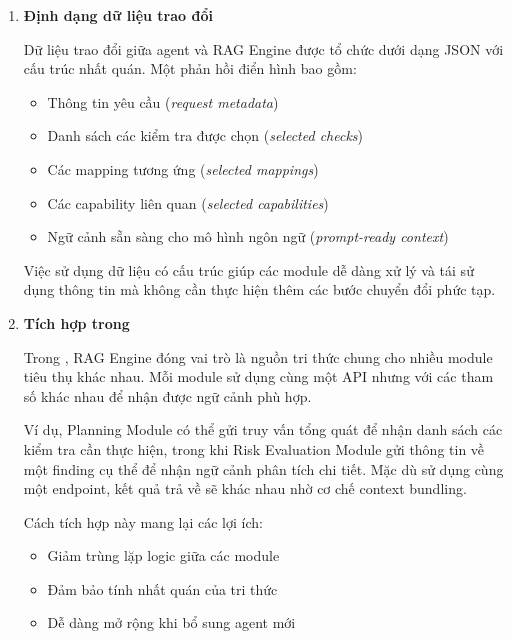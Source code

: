 \begin{enumerate}
    Luồng tương tác bao gồm:
    \begin{itemize}
        \item Agent xác định nhu cầu (planning, risk analysis hoặc reporting)
        \item Module gửi yêu cầu đến RAG Engine kèm theo các tham số cần thiết
        \item RAG Engine thực hiện pipeline truy hồi và xây dựng ngữ cảnh
        \item Kết quả được trả về dưới dạng bundle có cấu trúc
        \item Agent sử dụng bundle làm đầu vào cho quá trình suy luận
    \end{itemize}

    Cách tiếp cận này giúp chuẩn hóa giao tiếp giữa các thành phần và giảm sự phụ thuộc giữa agent và hệ thống lưu trữ tri thức.

    \item \textbf{Định dạng dữ liệu trao đổi}

    Dữ liệu trao đổi giữa agent và RAG Engine được tổ chức dưới dạng JSON với cấu trúc nhất quán. Một phản hồi điển hình bao gồm:
    \begin{itemize}
        \item Thông tin yêu cầu (\textit{request metadata})
        \item Danh sách các kiểm tra được chọn (\textit{selected checks})
        \item Các mapping tương ứng (\textit{selected mappings})
        \item Các capability liên quan (\textit{selected capabilities})
        \item Ngữ cảnh sẵn sàng cho mô hình ngôn ngữ (\textit{prompt-ready context})
    \end{itemize}

    Việc sử dụng dữ liệu có cấu trúc giúp các module dễ dàng xử lý và tái sử dụng thông tin mà không cần thực hiện thêm các bước chuyển đổi phức tạp.

    \item \textbf{Tích hợp trong \sysnameshort{}}

    Trong \sysnameshort{}, RAG Engine đóng vai trò là nguồn tri thức chung cho nhiều module tiêu thụ khác nhau. Mỗi module sử dụng cùng một API nhưng với các tham số khác nhau để nhận được ngữ cảnh phù hợp.

    Ví dụ, Planning Module có thể gửi truy vấn tổng quát để nhận danh sách các kiểm tra cần thực hiện, trong khi Risk Evaluation Module gửi thông tin về một finding cụ thể để nhận ngữ cảnh phân tích chi tiết. Mặc dù sử dụng cùng một endpoint, kết quả trả về sẽ khác nhau nhờ cơ chế context bundling.

    Cách tích hợp này mang lại các lợi ích:
    \begin{itemize}
        \item Giảm trùng lặp logic giữa các module
        \item Đảm bảo tính nhất quán của tri thức
        \item Dễ dàng mở rộng khi bổ sung agent mới
    \end{itemize}

\end{enumerate}

